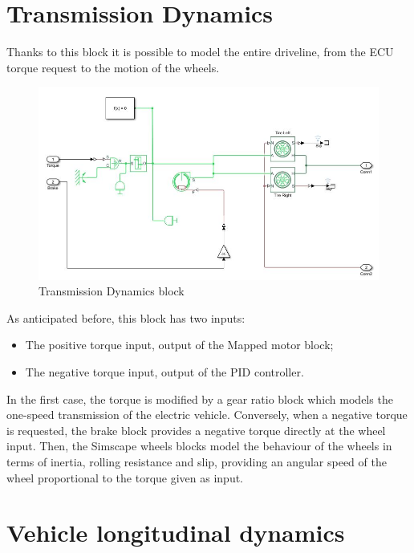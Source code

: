 \documentclass[12pt,a4paper]{report}
\begin{document}
\section{Transmission Dynamics}



Thanks to this block it is possible to model the entire driveline, from the ECU torque request to the motion of the wheels.
 
 \begin{figure}[htbp]
 	\centering
 	\includegraphics[scale=0.8]{TransmissionDynamics.jpg}
 	\caption{Transmission Dynamics block}
 \end{figure}

As anticipated before, this block has two inputs:
\begin{itemize}
	
	\item The positive torque input, output of the Mapped motor block; 
	
	\item The negative torque input, output of the PID controller.
	
\end{itemize}

In the first case, the torque is modified by a gear ratio block which models the one-speed transmission of the electric vehicle. Conversely, when a negative torque is requested, the brake block provides a negative torque directly at the wheel input. Then, the Simscape wheels blocks model the behaviour of the wheels in terms of inertia, rolling resistance and slip, providing an angular speed of the wheel proportional to the torque given as input.

\section{Vehicle longitudinal dynamics}
\end{document}
